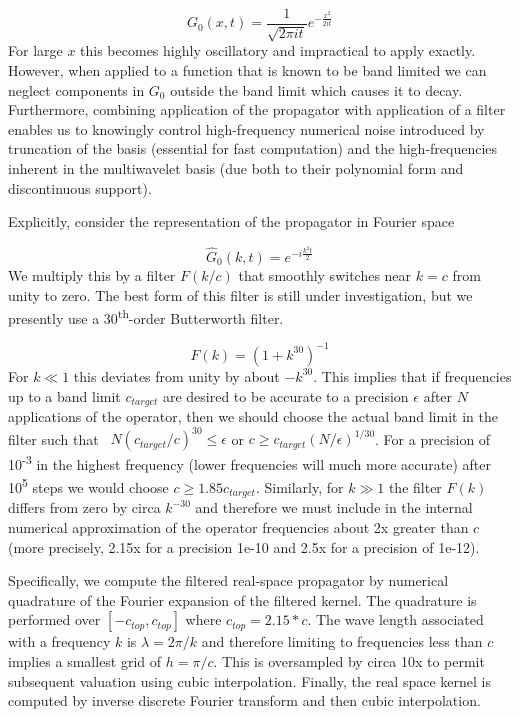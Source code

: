 \documentclass[letterpaper]{book}
\begin{document}
\begin{equation}
G_{0}(x,t)=\frac{1}{\sqrt{2\pi it}}e^{-{\frac{x^{2}}{2it}}}
\end{equation}
For large  $x$ this becomes highly oscillatory and impractical to apply exactly. However, when applied to a function
that is known to be band limited we can neglect components in  $G_{0}$ outside the band limit which causes it to decay.
Furthermore, combining application of the propagator with application of a filter enables us to knowingly control
high-frequency numerical noise introduced by truncation of the basis (essential for fast computation) and the
high-frequencies inherent in the multiwavelet basis (due both to their polynomial form and discontinuous support).

Explicitly, consider the representation of the propagator in Fourier space 

\begin{equation}
{\hat{G}}_{0}(k,t)=e^{-i\frac{k^{2}t}{2}}
\end{equation}
We multiply this by a filter  $F(k/c)$ that smoothly switches near  $k=c$ from unity to zero. The best form of this
filter is still under investigation, but we presently use a 30\textsuperscript{th}{}-order Butterworth filter. 

\begin{equation}
F(k)=\left(1+k^{30}\right)^{-1}
\end{equation}
For  $k\ll 1$ this deviates from unity by about  $-k^{30}$. This implies that if frequencies up to a band limit 
$c_{\mathit{target}}$ are desired to be accurate to a precision  $\epsilon $ after  $N$ applications of the operator,
then we should choose the actual band limit in the filter such that \  $N(c_{\mathit{target}}/c)^{30}\le \epsilon $ or 
$c\ge c_{\mathit{target}}(N/\epsilon )^{1/30}$. For a precision of 10\textsuperscript{{}-3} in the highest frequency
(lower frequencies will much more accurate) after 10\textsuperscript{5} steps we would choose  $c\ge
1.85c_{\mathit{target}}$. Similarly, for  $k\gg 1$ the filter  $F(k)$ differs from zero by circa  $k^{-30}$ and
therefore we must include in the internal numerical approximation of the operator frequencies about 2x greater than 
$c$ (more precisely, 2.15x for a precision 1e-10 and 2.5x for a precision of 1e-12).

Specifically, we compute the filtered real-space propagator by numerical quadrature of the Fourier expansion of the
filtered kernel. The quadrature is performed over  $[-c_{\mathit{top}},c_{\mathit{top}}]$ where 
$c_{\mathit{top}}=2.15\ast c$. The wave length associated with a frequency  $k$ is  $\lambda =2\pi /k$ and therefore
limiting to frequencies less than  $c$ implies a smallest grid of  $h=\pi /c$. This is oversampled by circa 10x to
permit subsequent valuation using cubic interpolation. Finally, the real space kernel is computed by inverse discrete
Fourier transform and then cubic interpolation.
\end{document}
